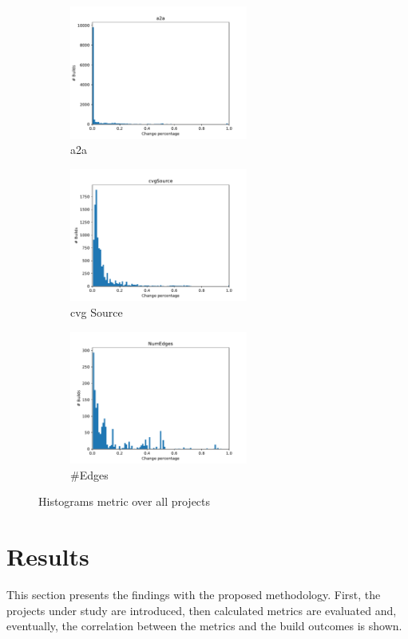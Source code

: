 \documentclass[conference]{IEEEtran}
\begin{document}
\begin{figure}[!t]
	\centering
	\begin{subfigure}{2.3in}
		\centering
		\includegraphics[width=2.3in]{assets/a2a.pdf}
		\caption{a2a}
		\label{a2aHist}
	\end{subfigure}%
	\begin{subfigure}{2.3in}
		\centering
		\includegraphics[width=2.3in]{assets/cvgSource.pdf}
		\caption{cvg Source}
		\label{cvgHist}
	\end{subfigure}%
	\begin{subfigure}{2.3in}
		\centering
		\includegraphics[width=2.3in]{assets/NumEdges.pdf}
		\caption{\#Edges}
		\label{numEdgesHist}
	\end{subfigure}
	\caption{Histograms metric over all projects}
	\label{fig:histograms}
\end{figure}

\section{Results}

This section presents the findings with the proposed methodology. First, the projects under study are introduced, then calculated metrics are evaluated and, eventually, the correlation between the metrics and the build outcomes is shown.
\end{document}
